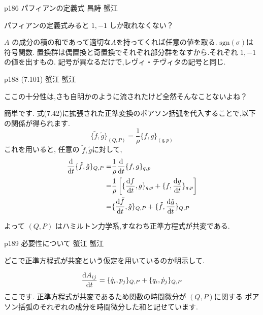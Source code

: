 \documentclass{jlreq}
\newcommand{\qsep}{%
  \tcblower
  \medskip
}
\begin{document}
\begin{qboxok}
  {p186 パフィアンの定義式}
  {昌詩}
  {蟹江}

  パフィアンの定義式みると \( 1,-1 \) しか取れなくない？

  \qsep

  \( A \) の成分の積の和であって適切な\( A \)を持ってくれば任意の値を取る.
  \( \mathrm{sgn}(\sigma)  \)は符号関数.
  置換群は偶置換と奇置換でそれぞれ部分群をなすから.それぞれ \( 1, -1 \)   の値を出すもの.
  記号が異なるだけで,レヴィ・チヴィタの記号と同じ.

\end{qboxok}

\begin{qboxok}
  {p188 (7.101)}
  {蟹江}
  {蟹江}

  ここの十分性は,さも自明かのように流されたけど全然そんなことないよね？

  \qsep

  簡単です.
  式(7.42)に拡張された正準変換のポアソン括弧を代入することで,以下の関係が得られます.
  \[\{\tilde{f} , \tilde{g}\}_{(Q,P)} = \frac{1}{\rho}  \{f,g\}_{(q,p)}   \]
  これを用いると,
  任意の \( \tilde{f}, \tilde{g} \)に対して,
  \begin{align*}
    \diff{}{t} \{\tilde{f}, \tilde{g}\}_{Q,P} 
    =& \frac{1}{\rho} \diff{}{t} \{f,g\}_{q,p}\\
    =& \frac{1}{\rho} \left[ \{ \diff{f}{t} , g \}_{q,p} + \{ f , \diff{g}{t} \}_{q,p}   \right] \\
    =& \{ \diff{\tilde{f}}{t} , \tilde{g} \}_{Q,P}  + \{ \tilde{f}, \diff{\tilde{g}}{t}  \}_{Q,P} 
  \end{align*} 

  よって \( (Q,P) \) はハミルトン力学系,すなわち正準方程式が共変である.

\end{qboxok}

\begin{qboxok}
  {p189 必要性について}
  {蟹江}
  {蟹江}

  どこで正準方程式が共変という仮定を用いているのか明示して.

  \qsep

  \[ \diff{A_{ij}}{t} = \{ \dot{q}_i , p_j\}_{Q,P} + \{ q_i , \dot{p}_j\}_{Q,P}  \]
  ここです.
  正準方程式が共変であるため関数の時間微分が \( (Q,P) \)に関する ポアソン括弧のそれぞれの成分を時間微分した和と記せています.

\end{qboxok}
\end{document}
